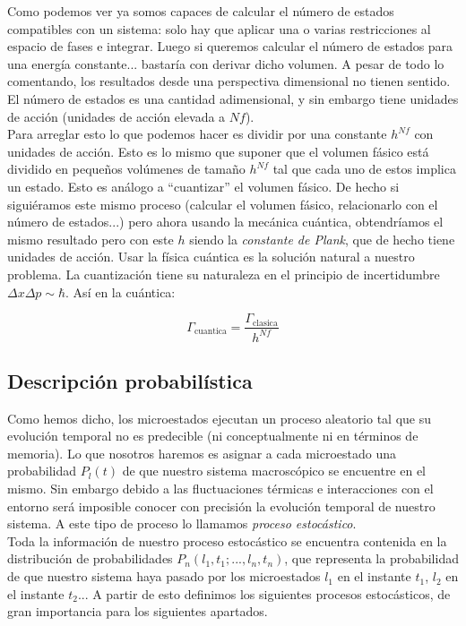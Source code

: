 \documentclass[12pt,a4paper]{article}
\numberwithin{equation}{section}
\numberwithin{figure}{section}
\theoremstyle{definition}
\begin{document}
Como podemos ver ya somos capaces de calcular el número de estados compatibles con un sistema: solo hay que aplicar una o varias restricciones al espacio de fases e integrar. Luego si queremos calcular el número de estados para una energía constante... bastaría con derivar dicho volumen. A pesar de todo lo comentando, los resultados desde una perspectiva dimensional no tienen sentido. El número de estados es una cantidad adimensional, y sin embargo tiene unidades de acción (unidades de acción elevada a $Nf$). \\

Para arreglar esto lo que podemos hacer es dividir por una constante $h^{Nf}$ con unidades de acción. Esto es lo mismo que suponer que el volumen fásico está dividido en pequeños volúmenes de tamaño $h^{Nf}$ tal que cada uno de estos implica un estado. Esto es análogo a ``cuantizar'' el volumen fásico. De hecho si siguiéramos este mismo proceso (calcular el volumen fásico, relacionarlo con el número de estados...) pero ahora usando la mecánica cuántica, obtendríamos el mismo resultado pero con este $h$ siendo la \textit{constante de Plank}, que de hecho tiene unidades de acción. Usar la física cuántica es la solución natural a nuestro problema. La cuantización tiene su naturaleza en el principio de incertidumbre  $\Delta x \Delta p \sim \hbar$. Así en la cuántica:

\begin{equation}
\Gamma_{\mathrm{cuantica}} = \dfrac{\Gamma_{\mathrm{clasica}}}{h^{Nf}}
\end{equation}

\subsection{Descripción probabilística}

Como hemos dicho, los microestados ejecutan un proceso aleatorio tal que su evolución temporal no es predecible (ni conceptualmente ni en términos de memoria). Lo que nosotros haremos es asignar a cada microestado una probabilidad $P_l(t)$ de que nuestro sistema macroscópico se encuentre en el mismo. Sin embargo debido a las fluctuaciones térmicas e interacciones con el entorno será imposible conocer con precisión la evolución temporal de nuestro sistema. A este tipo de proceso lo llamamos \textit{proceso estocástico}. \\

Toda la información de nuestro proceso estocástico se encuentra contenida en la distribución de probabilidades  $P_n(l_1,t_1;...,l_n,t_n)$, que representa la probabilidad de que nuestro sistema haya pasado por los microestados $l_1$ en el instante $t_1$, $l_2$ en el instante $t_2$... A partir de esto definimos los siguientes procesos estocásticos, de gran importancia para los siguientes apartados. \\
\end{document}
